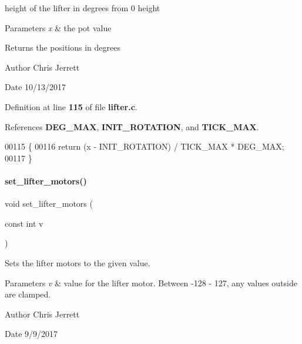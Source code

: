 height of the lifter in degrees from 0 height 


\begin{DoxyParams}{Parameters}
{\em x} & the pot value \\
\hline
\end{DoxyParams}
\begin{DoxyReturn}{Returns}
the positions in degrees 
\end{DoxyReturn}
\begin{DoxyAuthor}{Author}
Chris Jerrett 
\end{DoxyAuthor}
\begin{DoxyDate}{Date}
10/13/2017 
\end{DoxyDate}


Definition at line \textbf{ 115} of file \textbf{ lifter.\+c}.



References \textbf{ D\+E\+G\+\_\+\+M\+AX}, \textbf{ I\+N\+I\+T\+\_\+\+R\+O\+T\+A\+T\+I\+ON}, and \textbf{ T\+I\+C\+K\+\_\+\+M\+AX}.


\begin{DoxyCode}
00115                                         \{
00116   \textcolor{keywordflow}{return} (x - INIT_ROTATION) / TICK_MAX * DEG_MAX;
00117 \}
\end{DoxyCode}
\mbox{\label{lifter_8h_a16ed2ef406519bbd4d091f6321f4ed8a}} 
\paragraph{set\+\_\+lifter\+\_\+motors()}
{\footnotesize\ttfamily void set\+\_\+lifter\+\_\+motors (\begin{DoxyParamCaption}\item[{const int}]{v }\end{DoxyParamCaption})}



Sets the lifter motors to the given value. 


\begin{DoxyParams}{Parameters}
{\em v} & value for the lifter motor. Between -\/128 -\/ 127, any values outside are clamped. \\
\hline
\end{DoxyParams}
\begin{DoxyAuthor}{Author}
Chris Jerrett 
\end{DoxyAuthor}
\begin{DoxyDate}{Date}
9/9/2017 
\end{DoxyDate}


